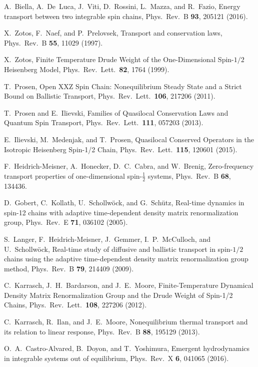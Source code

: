 \documentclass[twocolumn,superscriptaddress,prb,10pt]{revtex4-1}
\begin{document}
\begin{thebibliography}{99}
A.~Biella, A.~De~Luca, J.~Viti, D.~Rossini, L.~Mazza, and R.~Fazio, 
Energy transport between two integrable spin chains, Phys.\ Rev.\ B {\bf 93}, 
205121 (2016). 

X.~Zotos, F.~Naef, and P.~Prelovsek, 
Transport and conservation laws, Phys.\ Rev.\ B {\bf 55}, 11029 (1997). 

X.~Zotos, Finite Temperature Drude Weight of the One-Dimensional Spin-$1/2$ Heisenberg Model, 
Phys.\ Rev.\ Lett.\ {\bf 82}, 1764 (1999). 

T.~Prosen, Open XXZ Spin Chain: Nonequilibrium Steady State and a Strict Bound on Ballistic Transport, 
Phys.\ Rev.\ Lett.\ {\bf 106}, 217206 (2011). 

T.~Prosen and E.~Ilievski, 
Families of Quasilocal Conservation Laws and Quantum Spin Transport, 
Phys.\ Rev.\ Lett.\ {\bf 111}, 057203 (2013). 

E.~Ilievski, M.~Medenjak, and T.~Prosen, Quasilocal Conserved 
Operators in the Isotropic Heisenberg Spin-1/2 Chain, 
Phys.\ Rev.\ Lett.\ {\bf 115}, 120601 (2015). 

F.~Heidrich-Meisner, A.~Honecker, D.~C.~Cabra, and W.~Brenig, Zero-frequency transport properties 
of one-dimensional spin-$\frac{1}{2}$ systems, Phys.\ Rev.\ B {\bf 68}, 134436. 

D.~Gobert, C.~Kollath, U.~Schollw\"ock, and G.~Sch\"utz, 
Real-time dynamics in spin-12 chains with adaptive time-dependent density matrix renormalization group, 
Phys.\ Rev.\ E {\bf 71}, 036102 (2005).

S.~Langer, F.~Heidrich-Meisner, J.~Gemmer, I.~P.~McCulloch, and U.~Schollw\"ock, 
Real-time study of diffusive and ballistic transport in spin-$1/2$ chains using the 
adaptive time-dependent density matrix renormalization group method, 
Phys.\ Rev.\ B {\bf 79}, 214409 (2009). 

C.~Karrasch, J.~H.~Bardarson, and J.~E.~Moore, 
Finite-Temperature Dynamical Density Matrix Renormalization Group and the Drude Weight of Spin-1/2 Chains, 
Phys.\ Rev.\ Lett.\ {\bf 108}, 227206 (2012). 

C.~Karrasch, R.~Ilan, and J.~E.~Moore, 
Nonequilibrium thermal transport and its relation to linear response, 
Phys.\ Rev.\ B {\bf 88}, 195129 (2013).

O.~A.~Castro-Alvared, B.~Doyon, and T.~Yoshimura, 
Emergent hydrodynamics in integrable systems out of equilibrium, 
Phys.\ Rev.\ X {\bf 6}, 041065 (2016). 


\end{thebibliography}
\end{document}
